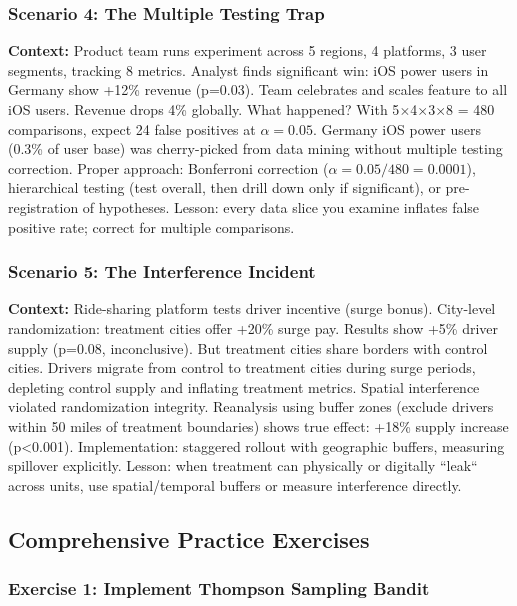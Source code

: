 \subsubsection{Scenario 4: The Multiple Testing Trap}

\textbf{Context:} Product team runs experiment across 5 regions, 4 platforms, 3 user segments, tracking 8 metrics. Analyst finds significant win: iOS power users in Germany show +12\% revenue (p=0.03). Team celebrates and scales feature to all iOS users. Revenue drops 4\% globally. What happened? With 5$\times$4$\times$3$\times$8 = 480 comparisons, expect 24 false positives at $\alpha=0.05$. Germany iOS power users (0.3\% of user base) was cherry-picked from data mining without multiple testing correction. Proper approach: Bonferroni correction ($\alpha=0.05/480=0.0001$), hierarchical testing (test overall, then drill down only if significant), or pre-registration of hypotheses. Lesson: every data slice you examine inflates false positive rate; correct for multiple comparisons.

\subsubsection{Scenario 5: The Interference Incident}

\textbf{Context:} Ride-sharing platform tests driver incentive (surge bonus). City-level randomization: treatment cities offer +20\% surge pay. Results show +5\% driver supply (p=0.08, inconclusive). But treatment cities share borders with control cities. Drivers migrate from control to treatment cities during surge periods, depleting control supply and inflating treatment metrics. Spatial interference violated randomization integrity. Reanalysis using buffer zones (exclude drivers within 50 miles of treatment boundaries) shows true effect: +18\% supply increase (p<0.001). Implementation: staggered rollout with geographic buffers, measuring spillover explicitly. Lesson: when treatment can physically or digitally ``leak`` across units, use spatial/temporal buffers or measure interference directly.

\subsection{Comprehensive Practice Exercises}

\subsubsection{Exercise 1: Implement Thompson Sampling Bandit}

